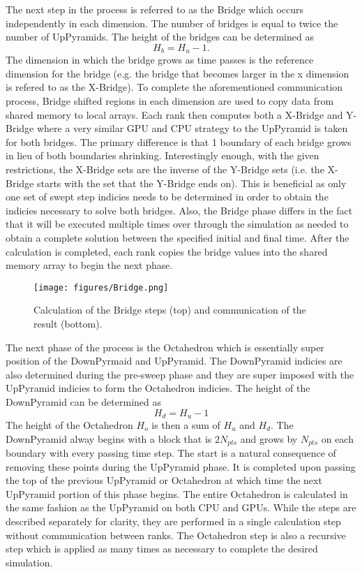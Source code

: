 \documentclass[review]{elsarticle}
\begin{document}
\par The next step in the process is referred to as the Bridge which occurs independently in each dimension. The number of bridges is equal to twice the number of UpPyramids. The height of the bridges can be determined as
\begin{equation}
  H_{b} = H_{u}-1.
\end{equation}
The dimension in which the bridge grows as time passes is the reference dimension for the bridge (e.g. the bridge that becomes larger in the x dimension is refered to as the X-Bridge). To complete the aforementioned communication process, Bridge shifted regions in each dimension are used to copy data from shared memory to local arrays. Each rank then computes both a X-Bridge and Y-Bridge where a very similar GPU and CPU strategy to the UpPyramid is taken for both bridges. The primary difference is that 1 boundary of each bridge grows in lieu of both boundaries shrinking. Interestingly enough, with the given restrictions, the X-Bridge sets are the inverse of the Y-Bridge sets (i.e. the X-Bridge starts with the set that the Y-Bridge ends on). This is beneficial as only one set of swept step indicies needs to be determined in order to obtain the indicies necessary to solve both bridges. Also, the Bridge phase differs in the fact that it will be executed multiple times over through the simulation as needed to obtain a complete solution between the specified initial and final time. After the calculation is completed, each rank copies the bridge values into the shared memory array to begin the next phase.
\begin{figure}[h!]
    \centering
       \texttt{[image: figures/Bridge.png]}
    \label{fig:BR}
    \caption{Calculation of the Bridge steps (top) and communication of the result (bottom).}
\end{figure}

\par The next phase of the process is the Octahedron which is essentially super position of the DownPyrmaid and UpPyramid. The DownPyramid indicies are also determined during the pre-sweep phase and they are super imposed with the UpPyramid indicies to form the Octahedron indicies.
The height of the DownPyramid can be determined as
\begin{equation}
  H_{d} =  H_{u}-1
\end{equation}
The height of the Octahedron $H_o$ is then a sum of $H_u$ and $H_d$. The DownPyramid alway begins with a block that is $2N_{pts}$ and grows by $N_{pts}$ on each boundary with every passing time step. The  start is a natural consequence of removing these points during the UpPyramid phase. It is completed upon passing the top of the previous UpPyramid or Octahedron at which time the next UpPyramid portion of this phase begins. The entire Octahedron is calculated in the same fashion as the UpPyramid on both CPU and GPUs. While the steps are described separately for clarity, they are performed in a single calculation step without communication between ranks. The Octahedron step is also a recursive step which is applied as many times as necessary to complete the desired simulation.
\end{document}
